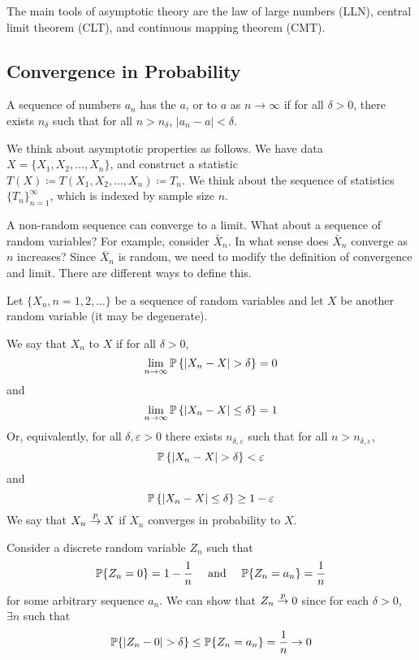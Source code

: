 \documentclass[10pt]{article}
\begin{document}
The main tools of asymptotic theory are the law of large numbers (LLN), central limit theorem (CLT), and continuous mapping theorem (CMT).

\subsection{Convergence in Probability}

\begin{definition}
	A sequence of numbers $a_n$ has the  $a$, or  to $a$ as $n \to \infty$ if for all $\delta > 0$, there exists $n_\delta$ such that for all $n > n_\delta$, $|a_n - a| < \delta$. 
\end{definition}

We think about asymptotic properties as follows. We have data $X = \{X_1,X_2,\dots,X_n\}$, and construct a statistic $T(X) \coloneqq T(X_1,X_2,\dots,X_n) \coloneqq T_n$. We think about the sequence of statistics $\{T_n\}_{n=1}^\infty$, which is indexed by sample size $n$. 

A non-random sequence can converge to a limit. What about a sequence of random variables? For example, consider $\bar{X}_n$. In what sense does $\bar{X}_n$ converge as $n$ increases? Since $\bar{X}_n$ is random, we need to modify the definition of convergence and limit. There are different ways to define this.

Let $\{X_n,n = 1,2,\dots\}$ be a sequence of random variables and let $X$ be another random variable (it may be degenerate).

\begin{definition}
	We say that $X_n$  to $X$ if for all $\delta > 0$, 
	\[
	\lim_{n\to\infty} \mathbb{P}\left\{|X_n  - X| > \delta \right\} = 0
	\]
	and
	\[
	\lim_{n\to\infty} \mathbb{P}\left\{|X_n  - X| \le \delta \right\} = 1
	\]
	Or, equivalently, for all $\delta, \varepsilon > 0$ there exists $n_{\delta,\varepsilon}$ such that for all $n > n_{\delta,\varepsilon}$,
	\[
	\mathbb{P}\left\{ |X_n - X| > \delta \right\} < \varepsilon
	\]
	and
	\[
	\mathbb{P}\left\{ |X_n - X| \le \delta \right\} \ge 1 - \varepsilon
	\]
	We say that $X_n \overset{p}{\to} X$ if $X_n$ converges in probability to $X$.
\end{definition}

\begin{example}
	Consider a discrete random variable $Z_n$ such that
	\[
	\mathbb{P}\{Z_n = 0\} = 1 - \frac{1}{n} \quad \text{ and } \quad \mathbb{P}\{Z_n = a_n\} = \frac{1}{n}
	\]
	for some arbitrary sequence $a_n$. We can show that $Z_n \overset{p}{\to} 0$ since for each $\delta > 0$, $\exists n$ such that
	\[
	\mathbb{P}\{|Z_n - 0| > \delta\} \le \mathbb{P}\{Z_n = a_n\} = \frac{1}{n} \to 0
	\]
\end{example}
\end{document}
